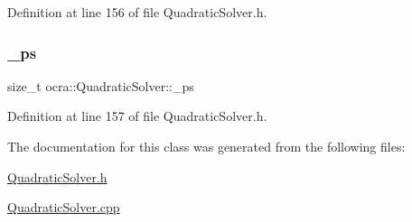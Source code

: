 Definition at line 156 of file Quadratic\+Solver.\+h.

\hypertarget{classocra_1_1QuadraticSolver_a8818ed9913cda8253fd181e46e963f58}{}\label{classocra_1_1QuadraticSolver_a8818ed9913cda8253fd181e46e963f58} 
\subsubsection{\texorpdfstring{\+\_\+ps}{\_ps}}
{\footnotesize\ttfamily size\+\_\+t ocra\+::\+Quadratic\+Solver\+::\+\_\+ps\hspace{0.3cm}{\ttfamily [protected]}}



Definition at line 157 of file Quadratic\+Solver.\+h.



The documentation for this class was generated from the following files\+:\begin{DoxyCompactItemize}
\item 
\hyperlink{QuadraticSolver_8h}{Quadratic\+Solver.\+h}\item 
\hyperlink{QuadraticSolver_8cpp}{Quadratic\+Solver.\+cpp}\end{DoxyCompactItemize}
